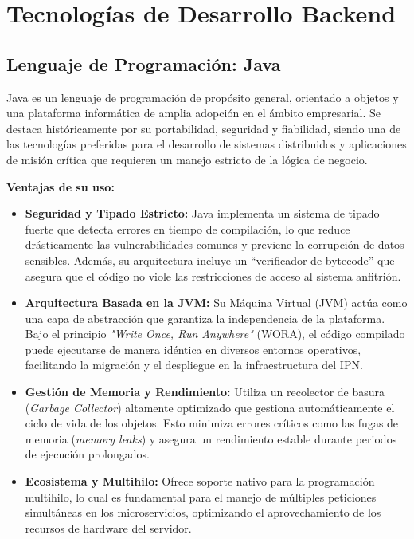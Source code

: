 \section{Tecnologías de Desarrollo Backend}

\subsection{Lenguaje de Programación: Java}
Java es un lenguaje de programación de propósito general, orientado a objetos y una plataforma informática de amplia adopción en el ámbito empresarial. Se destaca históricamente por su portabilidad, seguridad y fiabilidad, siendo una de las tecnologías preferidas para el desarrollo de sistemas distribuidos y aplicaciones de misión crítica que requieren un manejo estricto de la lógica de negocio.

\textbf{Ventajas de su uso:}
\begin{itemize}
\item \textbf{Seguridad y Tipado Estricto:} Java implementa un sistema de tipado fuerte que detecta errores en tiempo de compilación, lo que reduce drásticamente las vulnerabilidades comunes y previene la corrupción de datos sensibles. Además, su arquitectura incluye un “verificador de bytecode” que asegura que el código no viole las restricciones de acceso al sistema anfitrión.

\item \textbf{Arquitectura Basada en la JVM:} Su Máquina Virtual (JVM) actúa como una capa de abstracción que garantiza la independencia de la plataforma. Bajo el principio \textit{"Write Once, Run Anywhere"} (WORA), el código compilado puede ejecutarse de manera idéntica en diversos entornos operativos, facilitando la migración y el despliegue en la infraestructura del IPN.

\item \textbf{Gestión de Memoria y Rendimiento:} Utiliza un recolector de basura (\textit{Garbage Collector}) altamente optimizado que gestiona automáticamente el ciclo de vida de los objetos. Esto minimiza errores críticos como las fugas de memoria (\textit{memory leaks}) y asegura un rendimiento estable durante periodos de ejecución prolongados.

\item \textbf{Ecosistema y Multihilo:} Ofrece soporte nativo para la programación multihilo, lo cual es fundamental para el manejo de múltiples peticiones simultáneas en los microservicios, optimizando el aprovechamiento de los recursos de hardware del servidor.

\end{itemize}


